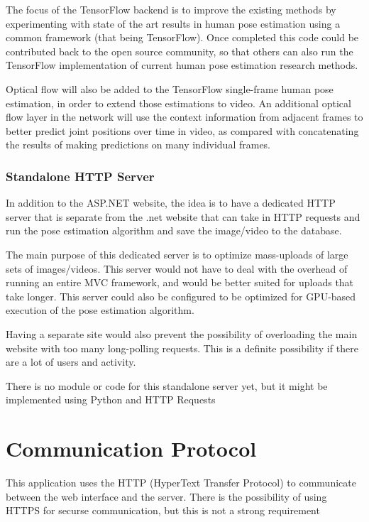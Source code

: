 \documentclass{scrreprt}
\begin{document}
The focus of the TensorFlow backend is to improve the existing methods by
experimenting with state of the art results in human pose estimation using a
common framework (that being TensorFlow). Once completed this code could be
contributed back to the open source community, so that others can also run the
TensorFlow implementation of current human pose estimation research methods.

Optical flow will also be added to the TensorFlow single-frame human pose
estimation, in order to extend those estimations to video. An additional
optical flow layer in the network will use the context information from
adjacent frames to better predict joint positions over time in video, as
compared with concatenating the results of making predictions on many
individual frames.

\subsection{Standalone HTTP Server}

In addition to the ASP.NET website, the idea is to have a dedicated HTTP server
that is separate from the .net website that can take in HTTP requests and run
the pose estimation algorithm and save the image/video to the database.

The main purpose of this dedicated server is to optimize mass-uploads of large
sets of images/videos. This server would not have to deal with the overhead of
running an entire MVC framework, and would be better suited for uploads that
take longer. This server could also be configured to be optimized for GPU-based
execution of the pose estimation algorithm.

Having a separate site would also prevent the possibility of overloading the
main website with too many long-polling requests. This is a definite
possibility if there are a lot of users and activity.

There is no module or code for this standalone server yet, but it might be
implemented using Python and HTTP Requests


\chapter{Communication Protocol}

This application uses the HTTP (HyperText Transfer Protocol) to communicate
between the web interface and the server. There is the possibility of using
HTTPS for securse communication, but this is not a strong requirement
\end{document}
